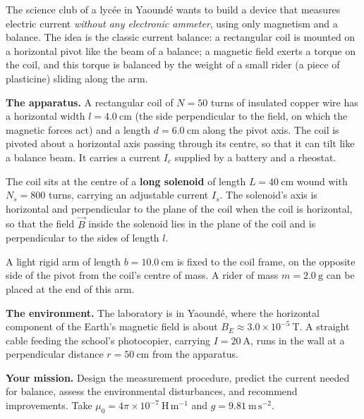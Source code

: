 \documentclass[11pt]{article}
\newcommand{\cle}[1]{{\popxbold\color{popdark}#1}}
\begin{document}
\begin{experience}
The science club of a lyc\'ee in Yaound\'e wants to build a device that measures electric current \emph{without any electronic ammeter}, using only magnetism and a balance. The idea is the classic \cle{current balance}: a rectangular coil is mounted on a horizontal pivot like the beam of a balance; a magnetic field exerts a torque on the coil, and this torque is balanced by the weight of a small rider (a piece of plasticine) sliding along the arm.

\medskip
\textbf{The apparatus.} A rectangular coil of $N = 50$ turns of insulated copper wire has a horizontal width $l = 4.0\ \mathrm{cm}$ (the side perpendicular to the field, on which the magnetic forces act) and a length $d = 6.0\ \mathrm{cm}$ along the pivot axis. The coil is pivoted about a horizontal axis passing through its centre, so that it can tilt like a balance beam. It carries a current $I_c$ supplied by a battery and a rheostat.

The coil sits at the centre of a \textbf{long solenoid} of length $L = 40\ \mathrm{cm}$ wound with $N_s = 800$ turns, carrying an adjustable current $I_s$. The solenoid's axis is horizontal and perpendicular to the plane of the coil when the coil is horizontal, so that the field $\vec{B}$ inside the solenoid lies in the plane of the coil and is perpendicular to the sides of length $l$.

A light rigid arm of length $b = 10.0\ \mathrm{cm}$ is fixed to the coil frame, on the opposite side of the pivot from the coil's centre of mass. A rider of mass $m = 2.0\ \mathrm{g}$ can be placed at the end of this arm.

\medskip
\textbf{The environment.} The laboratory is in Yaound\'e, where the horizontal component of the Earth's magnetic field is about $B_E \approx 3.0\times 10^{-5}\ \mathrm{T}$. A straight cable feeding the school's photocopier, carrying $I = 20\ \mathrm{A}$, runs in the wall at a perpendicular distance $r = 50\ \mathrm{cm}$ from the apparatus.

\medskip
\textbf{Your mission.} Design the measurement procedure, predict the current needed for balance, assess the environmental disturbances, and recommend improvements. Take $\mu_0 = 4\pi \times 10^{-7}\ \mathrm{H\,m^{-1}}$ and $g = 9.81\ \mathrm{m\,s^{-2}}$.
\end{experience}
\end{document}
